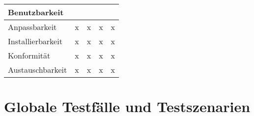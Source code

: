 \documentclass[parskip=full,11pt]{scrartcl}
\begin{document}
\begin{table}[H]
\begin{center}
\begin{tabularx}{\textwidth}{X c c c c}
	  \hline	  	
	  \multicolumn{5}{l}{\textbf{Benutzbarkeit}}\\
      \hline
      Anpassbarkeit & x & x & x & x\\
	  Installierbarkeit & x & x & x & x\\
	  Konformität & x & x & x & x\\
	  Austauschbarkeit & x & x & x & x\\
	  
	  \hline      			
    \end{tabularx}
  \end{center}
  
\end{table}
\renewcommand{\arraystretch}{1}
\section{Globale Testfälle und Testszenarien}

\newpage
\printglossary	
\end{document}
